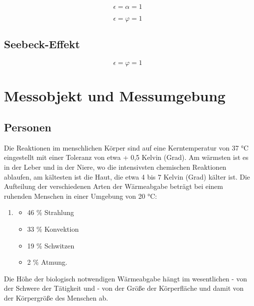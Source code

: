 \begin{equation}
\label{eq4}
\epsilon = \alpha  = 1
\end{equation}

\begin{equation}
\label{eq4}
\epsilon = \varphi  = 1
\end{equation}



\subsection{Seebeck-Effekt}

\begin{equation}
\label{eq4}
\epsilon = \varphi  = 1
\end{equation}



\section{Messobjekt und Messumgebung}


\subsection{Personen}
Die Reaktionen im menschlichen Körper sind auf eine Kerntemperatur von 37 °C eingestellt
mit einer Toleranz von etwa + 0,5 Kelvin (Grad). Am wärmsten ist es in der Leber und in der
Niere, wo die intensivsten chemischen Reaktionen ablaufen, am kältesten ist die Haut, die
etwa 4 bis 7 Kelvin (Grad) kälter ist.
Die Aufteilung der verschiedenen Arten der Wärmeabgabe beträgt bei einem ruhenden
Menschen in einer Umgebung von 20 °C:

\begin{enumerate}
\item 
\begin{itemize}
	\item  46 \% Strahlung
	\item  33 \% Konvektion
	\item  19 \% Schwitzen
	\item   2 \% Atmung.
\end{itemize}
\end{enumerate}	


Die Höhe der biologisch notwendigen Wärmeabgabe hängt im wesentlichen
- von der Schwere der Tätigkeit und
- von der Größe der Körperfläche und damit von der Körpergröße des Menschen ab.


